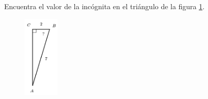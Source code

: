 \question[15]  Encuentra el valor de la incógnita en el triángulo de la figura \ref{fig:angle_functrig_12}.
\begin{figure}[H]
    \begin{center}
        \includegraphics[width=0.15\textwidth]{../images/angle_functrig_12.png}
    \end{center}
    \caption{}
    \label{fig:angle_functrig_12}
\end{figure}